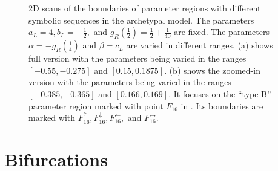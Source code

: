\begin{figure}[h!]
	\centering
	\caption[2D scans of the boundaries of parameter regions with different symbolic sequences in the archetypal model]{
		2D scans of the boundaries of parameter regions with different symbolic sequences in the archetypal model.
		The parameters $a_L = 4, b_L = -\frac{1}{2},$ and $g_R\left(\frac{1}{2}\right) = \frac{1}{2} + \frac{1}{40}$ are fixed.
		The parameters $\alpha = -g_R\left(\frac{1}{4}\right)$ and $\beta = c_L$ are varied in different ranges.
		(a) shows full version with the parameters being varied in the ranges $[-0.55, -0.275]$ and $[0.15, 0.1875]$.
		(b) shows the zoomed-in version with the parameters being varied in the ranges $[-0.385, -0.365]$ and $[0.166, 0.169]$.
		It focuses on the ``type B'' parameter region marked with point $F_{16}$ in .
		Its boundaries are marked with $F_{16}^\uparrow, F_{16}^\downarrow, F_{16}^\leftarrow,$ and $F_{16}^\rightarrow$.
	}
	\label{fig:arch.dyn.regions}
\end{figure}

\section{Bifurcations}
\label{sec:arch.bif}


